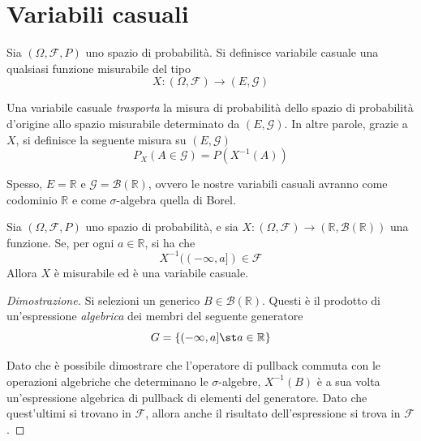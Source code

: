    \section{Variabili casuali}
        \begin{definition}
            Sia $(\Omega, \mathcal{F}, P)$ uno spazio di probabilità.
            Si definisce variabile casuale una qualsiasi funzione misurabile del tipo
            \[
                X: (\Omega, \mathcal{F}) \rightarrow (E, \mathcal{G})
            \]
        \end{definition}

        Una variabile casuale \textit{trasporta} la misura di probabilità dello spazio di probabilità d'origine allo spazio misurabile determinato da $(E, \mathcal{G})$.
        In altre parole, grazie a $X$, si definisce la seguente misura su $(E, \mathcal{G})$
        \[
            P_{X}(A \in \mathcal{G}) = P(X^{-1}(A))
        \]

        Spesso, $E = \mathbb{R}$ e $\mathcal{G} = \mathcal{B}(\mathbb{R})$, ovvero le nostre variabili casuali avranno come codominio $\mathbb{R}$ e come $\sigma$-algebra quella di Borel.

        \begin{theorem}
            Sia $(\Omega, \mathcal{F}, P)$ uno spazio di probabilità, e sia $X: (\Omega, \mathcal{F}) \rightarrow (\mathbb{R}, \mathcal{B}(\mathbb{R}))$ una funzione.
            Se, per ogni $a \in \mathbb{R}$, si ha che
            \[
                X^{-1}((-\infty, a]) \in \mathcal{F}
            \]
            Allora $X$ è misurabile ed è una variabile casuale.
        \end{theorem}

        \begin{proof}[Dimostrazione]
            Si selezioni un generico $B \in \mathcal{B}(\mathbb{R})$.
            Questi è il prodotto di un'espressione \textit{algebrica} dei membri del seguente generatore
            \[
                G = \{(-\infty, a] \st a \in \mathbb{R}\}
            \]

            Dato che è possibile dimostrare che l'operatore di pullback commuta con le operazioni algebriche che determinano le $\sigma$-algebre, $X^{-1}(B)$ è a sua volta un'espressione algebrica di pullback di elementi del generatore.
            Dato che quest'ultimi si trovano in $\mathcal{F}$, allora anche il risultato dell'espressione si trova in $\mathcal{F}$.
        \end{proof}


